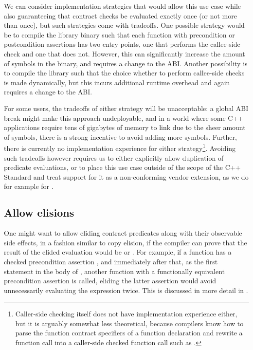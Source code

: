 We can consider implementation strategies that would allow this use case while also guaranteeing that contract checks be evaluated exactly once (or not more than once), but such strategies come with tradeoffs. One possible strategy would be to compile the library binary such that each function with precondition or postcondition assertions has two entry points, one that performs the callee-side check and one that does not. However, this can significantly increase the amount of symbols in the binary, and requires a change to the ABI. Another possibility is to compile the library such that the choice whether to perform callee-side checks is made dynamically, but this incurs additional runtime overhead and again requires a change to the ABI.

For some users, the tradeoffs of either strategy will be unacceptable: a global ABI break might make this approach undeployable, and in a world where some C++ applications require tens of gigabytes of memory to link due to the sheer amount of symbols, there is a strong incentive to avoid adding more symbols. Further, there is currently no implementation experience for either strategy\footnote{Caller-side checking itself does not have implementation experience either, but it is arguably somewhat less theoretical, because compilers know how to parse the function contract specifiers of a function declaration and rewrite a function call  into a caller-side checked function call such as \mbox{}.}. Avoiding such tradeoffs however requires us to either explicitly allow duplication of predicate evaluations, or to place this use case outside of the scope of the C++ Standard and treat support for it as a non-conforming vendor extension, as we do for example for .

\subsection{Allow elisions}
\label{subsec:elisions}

One might want to allow eliding contract predicates along with their observable side effects, in a fashion similar to copy elision, if the compiler can prove that the result of the elided evaluation would be  or . For example, if a function  has a checked precondition assertion , and immediately after that, as the first statement in the body of , another function  with a functionally equivalent precondition assertion is called, eliding the latter assertion would avoid unnecessarily evaluating the expression  twice. This is discussed in more detail in \cite{P2751R1}.

